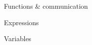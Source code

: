 \documentclass[aspectratio=1610]{beamer}
\begin{document}

\begin{frame}[t,plain]{Functions \& communication}

\end{frame}



\begin{frame}[t,plain]{Expressions}

\end{frame}


\begin{frame}[t,plain]{Variables}

\end{frame}
\end{document}

